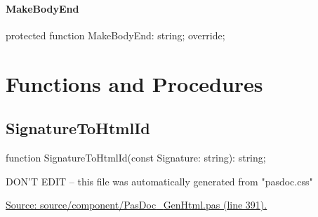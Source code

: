\documentclass{report}
\newif\ifpdf
\begin{document}
\paragraph*{MakeBodyEnd}\hspace*{\fill}

\label{PasDoc_GenHtml.THTMLDocGenerator-MakeBodyEnd}
\begin{list}{}{
\setlength{\itemindent}{0cm}
\setlength{\listparindent}{0cm}
\setlength{\leftmargin}{\evensidemargin}
\addtolength{\leftmargin}{\tmplength}
\settowidth{\labelsep}{X}
\addtolength{\leftmargin}{\labelsep}
\setlength{\labelwidth}{\tmplength}
}
\item[\textbf{Declaration}\hfill]
\ifpdf
\begin{flushleft}
\fi
\begin{ttfamily}
protected function MakeBodyEnd: string; override;\end{ttfamily}

\ifpdf
\end{flushleft}
\fi

\end{list}
\section{Functions and Procedures}
\ifpdf
\subsection*{\large{\textbf{SignatureToHtmlId}}\normalsize\hspace{1ex}\hrulefill}
\else
\subsection*{SignatureToHtmlId}
\fi
\label{PasDoc_GenHtml-SignatureToHtmlId}
\begin{list}{}{
\setlength{\itemindent}{0cm}
\setlength{\listparindent}{0cm}
\setlength{\leftmargin}{\evensidemargin}
\addtolength{\leftmargin}{\tmplength}
\settowidth{\labelsep}{X}
\addtolength{\leftmargin}{\labelsep}
\setlength{\labelwidth}{\tmplength}
}
\item[\textbf{Declaration}\hfill]
\ifpdf
\begin{flushleft}
\fi
\begin{ttfamily}
function SignatureToHtmlId(const Signature: string): string;\end{ttfamily}

\ifpdf
\end{flushleft}
\fi

\par
\item[\textbf{Description}]
DON'T EDIT -- this file was automatically generated from "pasdoc.css"\par
\href{https://github.com/pasdoc/pasdoc/blob/master/source/component/PasDoc_GenHtml.pas#L391}{Source: source/component/PasDoc{\_}GenHtml.pas (line 391).}

\end{list}
\ifpdf
\end{document}
